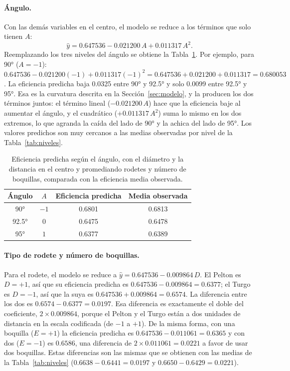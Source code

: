 \paragraph{Ángulo.} Con las demás variables en el centro, el modelo se reduce a los términos que solo tienen $A$:
\[
\hat{y} = 0.647536 - 0.021200\,A + 0.011317\,A^2 .
\]
Reemplazando los tres niveles del ángulo se obtiene la Tabla~\ref{tab:pred_angulo}. Por ejemplo, para 90° ($A = -1$): $0.647536 - 0.021200(-1) + 0.011317(-1)^2 = 0.647536 + 0.021200 + 0.011317 = 0.680053$. La eficiencia predicha baja 0.0325 entre 90° y 92.5° y solo 0.0099 entre 92.5° y 95°. Esa es la curvatura descrita en la Sección~\ref{sec:modelo}, y la producen los dos términos juntos: el término lineal ($-0.021200\,A$) hace que la eficiencia baje al aumentar el ángulo, y el cuadrático ($+0.011317\,A^2$) suma lo mismo en los dos extremos, lo que agranda la caída del lado de 90° y la achica del lado de 95°. Los valores predichos son muy cercanos a las medias observadas por nivel de la Tabla~\ref{tab:niveles}.

\begin{table}[ht]
\centering
\caption{Eficiencia predicha según el ángulo, con el diámetro y la distancia en el centro y promediando rodetes y número de boquillas, comparada con la eficiencia media observada.}
\label{tab:pred_angulo}
\begin{tabular}{cccc}
\toprule
Ángulo & $A$ & Eficiencia predicha & Media observada \\
\midrule
90°   & $-1$ & 0.6801 & 0.6813 \\
92.5° & $0$  & 0.6475 & 0.6478 \\
95°   & $1$  & 0.6377 & 0.6389 \\
\bottomrule
\end{tabular}
\end{table}

\paragraph{Tipo de rodete y número de boquillas.} Para el rodete, el modelo se reduce a $\hat{y} = 0.647536 - 0.009864\,D$. El Pelton es $D = +1$, así que su eficiencia predicha es $0.647536 - 0.009864 = 0.6377$; el Turgo es $D = -1$, así que la suya es $0.647536 + 0.009864 = 0.6574$. La diferencia entre los dos es $0.6574 - 0.6377 = 0.0197$. Esa diferencia es exactamente el doble del coeficiente, $2 \times 0.009864$, porque el Pelton y el Turgo están a dos unidades de distancia en la escala codificada (de $-1$ a $+1$). De la misma forma, con una boquilla ($E = +1$) la eficiencia predicha es $0.647536 - 0.011061 = 0.6365$ y con dos ($E = -1$) es $0.6586$, una diferencia de $2 \times 0.011061 = 0.0221$ a favor de usar dos boquillas. Estas diferencias son las mismas que se obtienen con las medias de la Tabla~\ref{tab:niveles} ($0.6638 - 0.6441 = 0.0197$ y $0.6650 - 0.6429 = 0.0221$).

